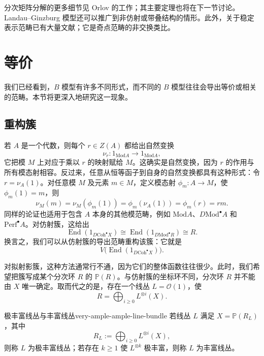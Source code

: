 分次矩阵分解的更多细节见 Orlov 的工作；其主要定理也将在下一节讨论。Landau--Ginzburg 模型还可以推广到非仿射或带叠结构的情形。此外，关于稳定表示范畴已有大量文献；它是奇点范畴的非交换类比。

\section{等价}\label{sec:equivalences}
我们已经看到，$B$ 模型有许多不同形式，而不同的 $B$ 模型往往会导出等价或相关的范畴。本节将更深入地研究这一现象。

\subsection{重构簇}\label{subsec:reconstructing-varieties}
若 $A$ 是一个代数，则每个 $r\in Z(A)$ 都给出自然变换
\[
  \nu_r\colon 1_{\mathrm{Mod}A}\longrightarrow1_{\mathrm{Mod}A},
\]
它把模 $M$ 上对应于乘以 $r$ 的映射赋给 $M$。这确实是自然变换，因为 $r$ 的作用与所有模态射相容。反过来，任意从恒等函子到自身的自然变换都具有这种形式：令 $r=\nu_A(1)$。对任意模 $M$ 及元素 $m\in M$，定义模态射 $\phi_m\colon A\to M$，使 $\phi_m(1)=m$，则
\[
  \nu_M(m)=\nu_M(\phi_m(1))=\phi_m(\nu_A(1))=\phi_m(r)=rm.
\]
同样的论证也适用于包含 $A$ 本身的其他模范畴，例如 $\mathrm{Mod}A$、$D\mathrm{Mod}^{\bullet}A$ 和 $\mathrm{Perf}^{\bullet}A$。对仿射簇，这给出
\[
  \operatorname{End}(1_{D\mathrm{Coh}^{\bullet}X})
  \cong \operatorname{End}(1_{D\mathrm{Mod}^{\bullet}R})\cong R.
\]
换言之，我们可以从仿射簇的导出范畴重构该簇：它就是
\[
  V\bigl(\operatorname{End}(1_{D\mathrm{Coh}^{\bullet}X})\bigr).
\]

对拟射影簇，这种方法通常行不通，因为它们的整体函数往往很少。此时，我们希望把簇写成某个分次环 $R$ 的 $\mathbb P(R)$。与仿射簇的坐标环不同，分次环 $R$ 并不能由 $X$ 唯一确定。取而代之的是，存在一个线丛 $L=\mathcal O(1)$，使
\[
  R=\bigoplus_{i\geq0}L^{\otimes i}(X).
\]

\begin{definition}{极丰富线丛与丰富线丛}{very-ample-ample-line-bundle}
若线丛 $L$ 满足 $X=\mathbb P(R_L)$，其中
\[
  R_L:=\bigoplus_{i\geq0}L^{\otimes i}(X),
\]
则称 $L$ 为极丰富线丛；若存在 $k\geq1$ 使 $L^{\otimes k}$ 极丰富，则称 $L$ 为丰富线丛。
\end{definition}


